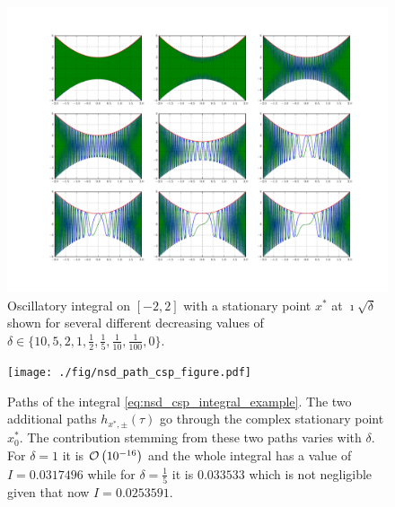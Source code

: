 \documentclass[a4paper,10pt]{article}
\begin{document}
\begin{figure}
  \centering
  \includegraphics[width=\linewidth]{./fig/oscillatory_integral_complex_sp.pdf}
  \caption{Oscillatory integral on $[-2,2]$ with a stationary point $x^{*}$ at $\imath \sqrt{\delta}$
  shown for several different decreasing values of
  $\delta \in \{10, 5, 2, 1, \frac{1}{2}, \frac{1}{5}, \frac{1}{10}, \frac{1}{100}, 0\}$.}
  \label{fig:oscillatory_integral_complex_sp}
\end{figure}

\begin{figure}
  \centering
  \texttt{[image: ./fig/nsd\_path\_csp\_figure.pdf]}
  \caption{Paths of the integral \eqref{eq:nsd_csp_integral_example}.
  The two additional paths $h_{x^{*},{\pm}}(\tau)$ go through the complex
  stationary point $x_0^{*}$. The contribution stemming from these two paths
  varies with $\delta$. For $\delta = 1$ it is $\mathcal{O}\left( 10^{-16} \right)$ and the whole
  integral has a value of $I = 0.0317496$ while for $\delta = \frac{1}{5}$ it is
  $0.033533$ which is not negligible given that now $I = 0.0253591$.}
  \label{fig:oscillatory_integral_complex_sp_paths}
\end{figure}
\end{document}
